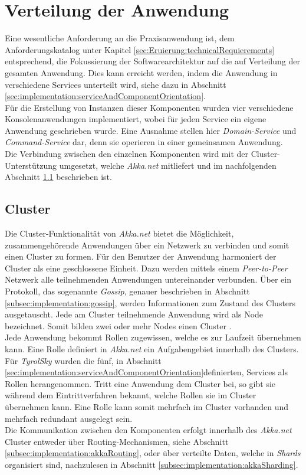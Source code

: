 \section{Verteilung der Anwendung}
\label{subsec:implementation:ApplicationDistribution}
Eine wesentliche Anforderung an die Praxisanwendung ist, dem Anforderungskatalog unter Kapitel \ref{sec:Eruierung:technicalRequierements} entsprechend, die Fokussierung der Softwarearchitektur auf die auf Verteilung der gesamten Anwendung. Dies kann erreicht werden, indem die Anwendung in verschiedene Services unterteilt wird, siehe dazu in Abschnitt \ref{sec:implementation:serviceAndComponentOrientation}. \\
Für die Erstellung von Instanzen dieser Komponenten wurden vier verschiedene Konsolenanwendungen implementiert, wobei für jeden Service ein eigene Anwendung geschrieben wurde. Eine Ausnahme stellen hier \textit{Domain-Service} und \textit{Command-Service} dar, denn sie operieren in einer gemeinsamen Anwendung. \\
Die Verbindung zwischen den einzelnen Komponenten wird mit der Cluster-Unterstützung umgesetzt, welche \textit{Akka.net} mitliefert und im nachfolgenden Abschnitt \ref{subsec:implementation:akka:cluster} beschrieben ist. 

\subsection{Cluster}
\label{subsec:implementation:akka:cluster}
Die Cluster-Funktionalität von \textit{Akka.net} bietet die Möglichkeit, zusammengehörende Anwendungen über ein Netzwerk zu verbinden und somit einen Cluster zu formen. Für den Benutzer der Anwendung harmoniert der Cluster als eine geschlossene Einheit. Dazu werden mittels einem \textit{Peer-to-Peer} Netzwerk alle teilnehmenden Anwendungen untereinander verbunden. Über ein Protokoll, das sogenannte \textit{Gossip}, genauer beschrieben in Abschnitt \ref{subsec:implementation:gossip}, werden Informationen zum Zustand des Clusters ausgetauscht. Jede am Cluster teilnehmende Anwendung wird als Node bezeichnet. Somit bilden zwei oder mehr Nodes einen Cluster \citep{akkaInAction}. \\
Jede Anwendung bekommt Rollen zugewissen, welche es zur Laufzeit übernehmen kann. Eine Rolle definiert in \textit{Akka.net} ein Aufgabengebiet innerhalb des Clusters. Für \textit{TyrolSky} wurden die fünf, in Abschnitt \ref{sec:implementation:serviceAndComponentOrientation}definierten, Services als Rollen herangenommen. Tritt eine Anwendung dem Cluster bei, so gibt sie während dem Eintrittverfahren bekannt, welche Rollen sie im Cluster übernehmen kann. Eine Rolle kann somit mehrfach im Cluster vorhanden und mehrfach redundant ausgelegt sein. \\
Die Kommunikation zwischen den Komponenten erfolgt innerhalb des \textit{Akka.net} Cluster entweder über Routing-Mechanismen, siehe Abschnitt \ref{subsec:implementation:akkaRouting}, oder über verteilte Daten, welche in \textit{Shards} organisiert sind, nachzulesen in Abschnitt \ref{subsec:implementation:akkaSharding}. 

